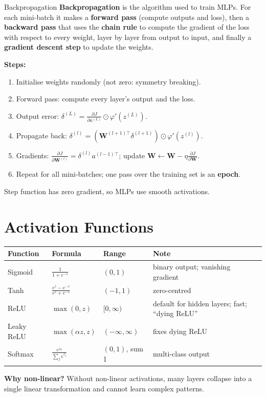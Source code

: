 \begin{dfn}{Backpropagation}
\textbf{Backpropagation} is the algorithm used to train MLPs. For each mini-batch it makes a \textbf{forward pass} (compute outputs and loss), then a \textbf{backward pass} that uses the \textbf{chain rule} to compute the gradient of the loss with respect to every weight, layer by layer from output to input, and finally a \textbf{gradient descent step} to update the weights.
\end{dfn}
\textbf{Steps:}
\begin{enumerate}
  \item Initialise weights randomly (not zero: symmetry breaking).
  \item Forward pass: compute every layer's output and the loss.
  \item Output error: $\delta^{(L)}=\frac{\partial J}{\partial a^{(L)}}\odot\varphi'(z^{(L)})$.
  \item Propagate back: $\delta^{(l)}=(\mathbf W^{(l+1)\top}\delta^{(l+1)})\odot\varphi'(z^{(l)})$.
  \item Gradients: $\frac{\partial J}{\partial\mathbf W^{(l)}}=\delta^{(l)}a^{(l-1)\top}$; update $\mathbf W\leftarrow\mathbf W-\eta\frac{\partial J}{\partial\mathbf W}$.
  \item Repeat for all mini-batches; one pass over the training set is an \textbf{epoch}.
\end{enumerate}
Step function has zero gradient, so MLPs use smooth activations.

\section{Activation Functions}
\begin{center}
\small
\begin{tabular}{@{}llll@{}}
\toprule
\textbf{Function} & \textbf{Formula} & \textbf{Range} & \textbf{Note}\\
\midrule
Sigmoid & $\frac1{1+e^{-z}}$ & $(0,1)$ & binary output; vanishing gradient\\
Tanh & $\frac{e^z-e^{-z}}{e^z+e^{-z}}$ & $(-1,1)$ & zero-centred\\
ReLU & $\max(0,z)$ & $[0,\infty)$ & default for hidden layers; fast; ``dying ReLU''\\
Leaky ReLU & $\max(\alpha z,z)$ & $(-\infty,\infty)$ & fixes dying ReLU\\
Softmax & $\frac{e^{z_k}}{\sum_je^{z_j}}$ & $(0,1)$, sum 1 & multi-class output\\
\bottomrule
\end{tabular}
\end{center}
\textbf{Why non-linear?} Without non-linear activations, many layers collapse into a single linear transformation and cannot learn complex patterns.


